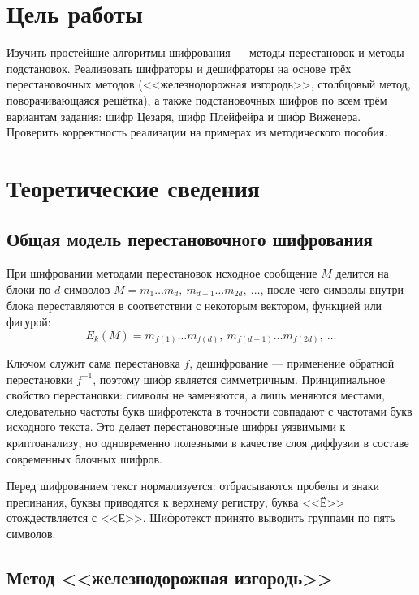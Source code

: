 \documentclass[14pt,a4paper]{extarticle}
\begin{document}

\tableofcontents

\section{Цель работы}

Изучить простейшие алгоритмы шифрования --- методы перестановок и методы подстановок.
Реализовать шифраторы и дешифраторы на основе трёх перестановочных методов
(<<железнодорожная изгородь>>, столбцовый метод, поворачивающаяся решётка), а также
подстановочных шифров по всем трём вариантам задания: шифр Цезаря, шифр Плейфейра и
шифр Виженера. Проверить корректность реализации на примерах из методического пособия.

\section{Теоретические сведения}

\subsection{Общая модель перестановочного шифрования}

При шифровании методами перестановок исходное сообщение $M$ делится на блоки по $d$
символов $M = m_1 \dots m_d,\ m_{d+1} \dots m_{2d},\ \dots$, после чего символы внутри
блока переставляются в соответствии с некоторым вектором, функцией или фигурой:
\begin{equation}
E_k(M) = m_{f(1)} \dots m_{f(d)},\ m_{f(d+1)} \dots m_{f(2d)},\ \dots
\end{equation}

Ключом служит сама перестановка $f$, дешифрование --- применение обратной
перестановки $f^{-1}$, поэтому шифр является симметричным. Принципиальное свойство
перестановки: символы не заменяются, а лишь меняются местами, следовательно частоты
букв шифротекста в точности совпадают с частотами букв исходного текста. Это делает
перестановочные шифры уязвимыми к криптоанализу, но одновременно полезными в качестве
слоя диффузии в составе современных блочных шифров.

Перед шифрованием текст нормализуется: отбрасываются пробелы и знаки препинания,
буквы приводятся к верхнему регистру, буква <<Ё>> отождествляется с <<Е>>.
Шифротекст принято выводить группами по пять символов.

\subsection{Метод <<железнодорожная изгородь>>}
\end{document}
